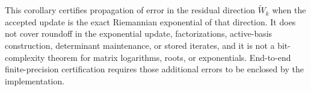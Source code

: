 This corollary certifies propagation of error in the residual direction
\(\widetilde W_k\) when the accepted update is the exact Riemannian exponential
of that direction.  It does not cover roundoff in the exponential update,
factorizations, active-basis construction, determinant maintenance, or stored
iterates, and it is not a bit-complexity theorem for matrix logarithms, roots,
or exponentials.  End-to-end finite-precision certification requires those
additional errors to be enclosed by the implementation.
